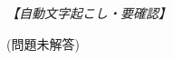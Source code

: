 \documentclass[../../main.tex]{subfiles}
\begin{document}
\begin{oframed}
  
\end{oframed}

\begin{flushright}
  \footnotesize\textit{【自動文字起こし・要確認】}
\end{flushright}

(問題未解答)

\newpage
\end{document}
